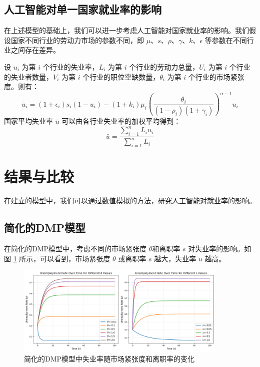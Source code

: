 \documentclass{article}
\begin{document}
\subsection{人工智能对单一国家就业率的影响}

在上述模型的基础上，我们可以进一步考虑人工智能对国家就业率的影响。我们假设国家不同行业的劳动力市场的参数不同，即 $\mu$、$s$、$\rho$、$\gamma$、$k$、$\epsilon$ 等参数在不同行业之间存在差异。

设 $u_i$ 为第 $i$ 个行业的失业率，$L_i$ 为第 $i$ 个行业的劳动力总量，$U_i$ 为第 $i$ 个行业的失业者数量，$V_i$ 为第 $i$ 个行业的职位空缺数量，$\theta_i$ 为第 $i$ 个行业的市场紧张度。则有：
\begin{equation}
    \dot{u_i} = (1 + \epsilon_i)s_i(1 - u_i) - (1 + k_i)\mu_i \left(\frac{\theta_i}{(1 - \rho_i)(1 + \gamma_i)}\right)^{\alpha-1} u_i
\end{equation}
国家平均失业率 $\bar{u}$ 可以由各行业失业率的加权平均得到：
\begin{equation}
    \bar{u} = \frac{\sum_{i=1}^n L_i u_i}{\sum_{i=1}^n L_i}
\end{equation}

\section{结果与比较}

在建立的模型中，我们可以通过数值模拟的方法，研究人工智能对就业率的影响。

\subsection{简化的DMP模型}

在简化的DMP模型中，考虑不同的市场紧张度 $\theta$和离职率 $s$ 对失业率的影响。如图 \ref{fig:simple_dmp} 所示，可以看到，市场紧张度 $\theta$ 或离职率 $s$ 越大，失业率 $u$ 越高。

\begin{figure}[H]
\centering
\includegraphics[width=0.9\textwidth]{img/simple_dmp.png}
\caption{简化的DMP模型中失业率随市场紧张度和离职率的变化}
\label{fig:simple_dmp}
\end{figure}
\end{document}
